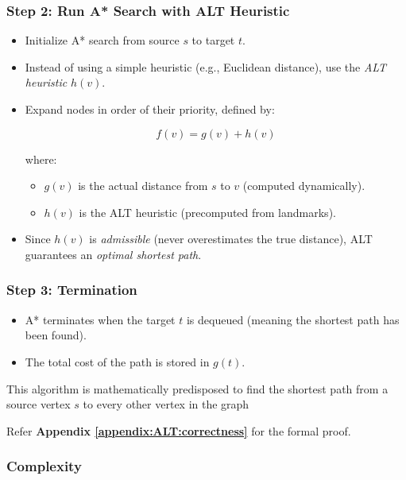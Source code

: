 				\subsubsection{Step 2: Run A* Search with ALT Heuristic}
				\begin{itemize}
					\item Initialize A* search from source $ s $ to target $ t $.
					\item Instead of using a simple heuristic (e.g., Euclidean distance), use the \textit{ALT heuristic}  $ h(v) $.
					\item Expand nodes in order of their priority, defined by:
					
					\begin{equation}
					f(v) = g(v) + h(v)
					\end{equation}
					
					where:
					\begin{itemize}
						\item $ g(v) $ is the actual distance from $ s $ to $ v $ (computed dynamically).
						\item $ h(v) $ is the ALT heuristic (precomputed from landmarks).
					\end{itemize}
					\item Since $ h(v) $ is \textit{admissible} (never overestimates the true distance), ALT guarantees an \textit{optimal shortest path}.
				\end{itemize}
				
				\subsubsection{Step 3: Termination}
				\begin{itemize}
					\item A* terminates when the target $ t $ is dequeued (meaning the shortest path has been found).
					\item The total cost of the path is stored in $ g(t) $.
				\end{itemize}

			This algorithm is mathematically predisposed to find the shortest path from a source vertex $s$ to every other vertex in the graph 
			
			Refer \textbf{ Appendix \ref{appendix:ALT:correctness}} for the formal proof.
			

		\subsubsection{Complexity}

